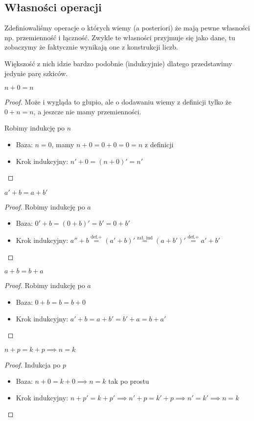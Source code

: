 \subsection{Własności operacji}

Zdefiniowaliśmy operacje o których wiemy (a posteriori) że mają pewne własności np. przemienność i łączność. Zwykle te własności przyjmuje się jako dane, tu zobaczymy że faktycznie wynikają one z konstrukcji liczb.

Większość z nich idzie bardzo podobnie (indukcyjnie) dlatego przedstawimy jedynie parę szkiców.

\begin{lemma}
	\( n + 0 = n \)
\end{lemma}
\begin{proof}
	Może i wygląda to głupio, ale o dodawaniu wiemy z definicji tylko że \( 0 + n = n \), a jeszcze nie mamy przemienności.

	Robimy indukcję po \( n \)
	\begin{itemize}
		\item Baza: \( n = 0 \), mamy \( n + 0 = 0 + 0 = 0 = n \) z definicji
		\item Krok indukcyjny: \( n' + 0 = (n + 0)' = n' \)
	\end{itemize}
\end{proof}

\begin{lemma}
	\( a' + b = a + b' \)
\end{lemma}
\begin{proof}
	Robimy indukcję po \( a \)
	\begin{itemize}
		\item Baza: \( 0' + b = (0 + b)' = b' = 0 + b' \)
		\item Krok indukcyjny: \( a'' + b \stackrel{\text{def.} +}{=} (a' + b)' \stackrel{\text{zał. ind}}{=} (a + b')' \stackrel{\text{def.} +}{=} a' + b' \)
	\end{itemize}
\end{proof}


\begin{theorem}
	\( a + b = b + a \)
\end{theorem}
\begin{proof}
	Robimy indukcję po \( a \)
	\begin{itemize}
		\item Baza: \( 0 + b = b = b + 0 \)
		\item Krok indukcyjny: \( a' + b = a + b' = b' + a = b + a' \)
	\end{itemize}
\end{proof}

\begin{theorem}
	\( n + p = k + p \implies n = k \)
\end{theorem}
\begin{proof}
	Indukcja po \( p \)
	\begin{itemize}
		\item Baza: \( n + 0 = k + 0 \implies n = k \) tak po prostu
		\item Krok indukcyjny: \( n + p' = k + p' \implies n' + p = k' + p \implies n' = k' \implies n = k \)
	\end{itemize}
\end{proof}